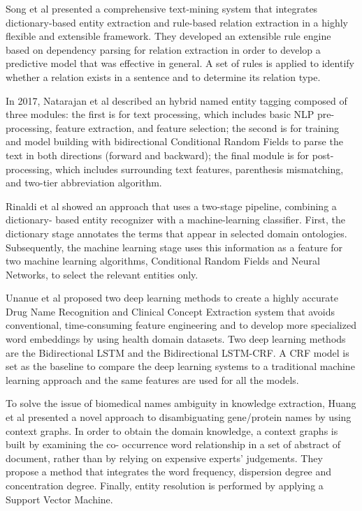 \documentclass[b5paper,]{book}
\theoremstyle{definition}
\theoremstyle{definition}
\theoremstyle{definition}
\theoremstyle{remark}
\begin{document}
Song et al \citep{song2015pkde4j} presented a comprehensive text-mining
system that integrates dictionary-based entity extraction and rule-based
relation extraction in a highly flexible and extensible framework. They
developed an extensible rule engine based on dependency parsing for
relation extraction in order to develop a predictive model that was
effective in general. A set of rules is applied to identify whether a
relation exists in a sentence and to determine its relation type.

In 2017, Natarajan et al \citep{murugesan2017bcc} described an hybrid
named entity tagging composed of three modules: the first is for text
processing, which includes basic NLP pre-processing, feature extraction,
and feature selection; the second is for training and model building
with bidirectional Conditional Random Fields to parse the text in both
directions (forward and backward); the final module is for
post-processing, which includes surrounding text features, parenthesis
mismatching, and two-tier abbreviation algorithm.

Rinaldi et al \citep{basaldella2017entity} showed an approach that uses
a two-stage pipeline, combining a dictionary- based entity recognizer
with a machine-learning classifier. First, the dictionary stage
annotates the terms that appear in selected domain ontologies.
Subsequently, the machine learning stage uses this information as a
feature for two machine learning algorithms, Conditional Random Fields
and Neural Networks, to select the relevant entities only.

Unanue et al \citep{unanue2017recurrent} proposed two deep learning
methods to create a highly accurate Drug Name Recognition and Clinical
Concept Extraction system that avoids conventional, time-consuming
feature engineering and to develop more specialized word embeddings by
using health domain datasets. Two deep learning methods are the
Bidirectional LSTM and the Bidirectional LSTM-CRF. A CRF model is set as
the baseline to compare the deep learning systems to a traditional
machine learning approach and the same features are used for all the
models.

To solve the issue of biomedical names ambiguity in knowledge
extraction, Huang et al \citep{huang2018novel} presented a novel
approach to disambiguating gene/protein names by using context graphs.
In order to obtain the domain knowledge, a context graphs is built by
examining the co- occurrence word relationship in a set of abstract of
document, rather than by relying on expensive experts' judgements. They
propose a method that integrates the word frequency, dispersion degree
and concentration degree. Finally, entity resolution is performed by
applying a Support Vector Machine.
\end{document}
